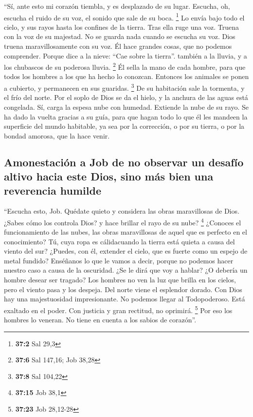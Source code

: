  ``Sí, ante esto mi corazón tiembla, y es desplazado de su
lugar.  Escucha, oh, escucha el ruido de su voz, el sonido
que sale de su boca. \footnote{\textbf{37:2} Sal 29,3}  Lo
envía bajo todo el cielo, y sus rayos hasta los confines de la tierra.
 Tras ella ruge una voz. Truena con la voz de su majestad.
No se guarda nada cuando se escucha su voz.  Dios truena
maravillosamente con su voz. Él hace grandes cosas, que no podemos
comprender.  Porque dice a la nieve: ``Cae sobre la
tierra''. también a la lluvia, y a los chubascos de su poderosa lluvia.
\footnote{\textbf{37:6} Sal 147,16; Job 38,28}  Él sella
la mano de cada hombre, para que todos los hombres a los que ha hecho lo
conozcan.  Entonces los animales se ponen a cubierto, y
permanecen en sus guaridas. \footnote{\textbf{37:8} Sal 104,22}
 De su habitación sale la tormenta, y el frío del norte.
 Por el soplo de Dios se da el hielo, y la anchura de las
aguas está congelada.  Sí, carga la espesa nube con
humedad. Extiende la nube de su rayo.  Se ha dado la
vuelta gracias a su guía, para que hagan todo lo que él les mandeen la
superficie del mundo habitable,  ya sea por la
corrección, o por su tierra, o por la bondad amorosa, que la hace venir.

\hypertarget{amonestaciuxf3n-a-job-de-no-observar-un-desafuxedo-altivo-hacia-este-dios-sino-muxe1s-bien-una-reverencia-humilde}{%
\subsection{Amonestación a Job de no observar un desafío altivo hacia
este Dios, sino más bien una reverencia
humilde}\label{amonestaciuxf3n-a-job-de-no-observar-un-desafuxedo-altivo-hacia-este-dios-sino-muxe1s-bien-una-reverencia-humilde}}

 ``Escucha esto, Job. Quédate quieto y considera las
obras maravillosas de Dios.  ¿Sabes cómo los controla
Dios? y hace brillar el rayo de su nube? \footnote{\textbf{37:15} Job
  38,1}  ¿Conoces el funcionamiento de las nubes, las
obras maravillosas de aquel que es perfecto en el conocimiento?
 Tú, cuya ropa es cálidacuando la tierra está quieta a
causa del viento del sur?  ¿Puedes, con él, extender el
cielo, que es fuerte como un espejo de metal fundido? 
Enséñanos lo que le vamos a decir, porque no podemos hacer nuestro caso
a causa de la oscuridad.  ¿Se le dirá que voy a hablar?
¿O debería un hombre desear ser tragado?  Los hombres no
ven la luz que brilla en los cielos, pero el viento pasa y los despeja.
 Del norte viene el esplendor dorado. Con Dios hay una
majestuosidad impresionante.  No podemos llegar al
Todopoderoso. Está exaltado en el poder. Con justicia y gran rectitud,
no oprimirá. \footnote{\textbf{37:23} Job 28,12-28}  Por
eso los hombres lo veneran. No tiene en cuenta a los sabios de
corazón''.


